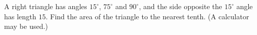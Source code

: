 A right triangle has angles $15^\circ$, $75^\circ$ and $90^\circ$, and the side opposite the $15^\circ$ angle has length $15$. Find the area of the triangle to the nearest tenth. (A calculator may be used.)
